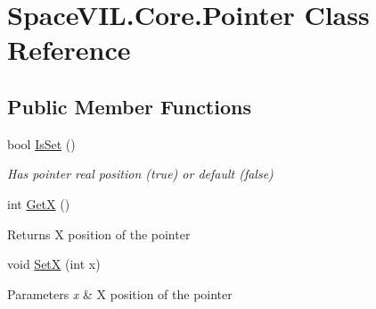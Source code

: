 \hypertarget{class_space_v_i_l_1_1_core_1_1_pointer}{}\section{Space\+V\+I\+L.\+Core.\+Pointer Class Reference}
\label{class_space_v_i_l_1_1_core_1_1_pointer}
\subsection*{Public Member Functions}
\begin{DoxyCompactItemize}
\item 
bool \mbox{\hyperlink{class_space_v_i_l_1_1_core_1_1_pointer_ab5a11690e60618f05b32ce065e3e9b30}{Is\+Set}} ()
\begin{DoxyCompactList}\small\item\em Has pointer real position (true) or default (false) \end{DoxyCompactList}\item 
\mbox{\label{class_space_v_i_l_1_1_core_1_1_pointer_ac320075447360c94c3a76ff3ca40098d}} 
int \mbox{\hyperlink{class_space_v_i_l_1_1_core_1_1_pointer_ac320075447360c94c3a76ff3ca40098d}{GetX}} ()
\begin{DoxyCompactList}\small\item\em \begin{DoxyReturn}{Returns}
X position of the pointer 
\end{DoxyReturn}
\end{DoxyCompactList}\item 
\mbox{\label{class_space_v_i_l_1_1_core_1_1_pointer_ab462a864c5d5ec7e573b134173d1a89d}} 
void \mbox{\hyperlink{class_space_v_i_l_1_1_core_1_1_pointer_ab462a864c5d5ec7e573b134173d1a89d}{SetX}} (int x)
\begin{DoxyCompactList}\small\item\em 
\begin{DoxyParams}{Parameters}
{\em x} & X position of the pointer \\
\hline
\end{DoxyParams}
\end{DoxyCompactList}\item 
\mbox{\label{class_space_v_i_l_1_1_core_1_1_pointer_a76b0864f2f94b1ddf4275f89867c2373}} 

\end{DoxyCompactItemize}
